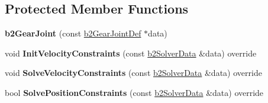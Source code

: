 \subsection*{Protected Member Functions}
\begin{DoxyCompactItemize}
\item 
\mbox{\label{classb2GearJoint_a4b247c79e74cb1e5b906527fe7d151ce}} 
{\bfseries b2\+Gear\+Joint} (const \mbox{\hyperlink{structb2GearJointDef}{b2\+Gear\+Joint\+Def}} $\ast$data)
\item 
\mbox{\label{classb2GearJoint_ac3c76db6940bcb4c94d564960b9c57ab}} 
void {\bfseries Init\+Velocity\+Constraints} (const \mbox{\hyperlink{structb2SolverData}{b2\+Solver\+Data}} \&data) override
\item 
\mbox{\label{classb2GearJoint_a25ff465354108f5ae2b60fb9f7836820}} 
void {\bfseries Solve\+Velocity\+Constraints} (const \mbox{\hyperlink{structb2SolverData}{b2\+Solver\+Data}} \&data) override
\item 
\mbox{\label{classb2GearJoint_a85633bbab3c4b4cb862bccce7e0253c2}} 
bool {\bfseries Solve\+Position\+Constraints} (const \mbox{\hyperlink{structb2SolverData}{b2\+Solver\+Data}} \&data) override
\end{DoxyCompactItemize}
